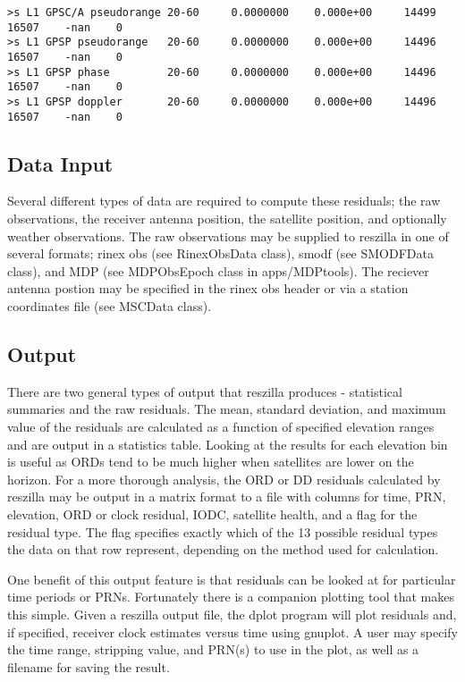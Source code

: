 \begin{\outputsize}
\begin{verbatim}
>s L1 GPSC/A pseudorange 20-60     0.0000000    0.000e+00     14499     16507    -nan    0
>s L1 GPSP pseudorange   20-60     0.0000000    0.000e+00     14496     16507    -nan    0
>s L1 GPSP phase         20-60     0.0000000    0.000e+00     14496     16507    -nan    0
>s L1 GPSP doppler       20-60     0.0000000    0.000e+00     14496     16507    -nan    0

\end{verbatim}

\end{\outputsize}

\subsection{Data Input}

Several different types of data are required to compute these
residuals; the raw observations, the receiver antenna position, the
satellite position, and optionally  weather observations. The raw
observations may be supplied to reszilla in one of several formats;
rinex obs (see RinexObsData class), smodf (see SMODFData class), and
MDP (see MDPObsEpoch class in apps/MDPtools). The reciever antenna
postion may be specified in the rinex obs header or via a station
coordinates file (see MSCData class).

\subsection{Output}
There are two general types of output that reszilla produces -
statistical summaries and the raw residuals.  The mean, standard 
deviation, and maximum value of the residuals are calculated 
as a function of specified elevation ranges and are output in a 
statistics table. Looking at the results for each elevation bin 
is useful as ORDs tend to be much higher when satellites are 
lower on the horizon. For a more thorough analysis, the ORD or DD 
residuals calculated by reszilla may be output in a matrix format 
to a file with columns for time, PRN, elevation, ORD or clock residual, 
IODC, satellite health, and a flag for the residual type.  The flag 
specifies exactly which of the 13 possible residual types the data 
on that row represent, depending on the method used for calculation. 

One benefit of this output feature is that residuals can be looked at 
for particular time periods or PRNs. Fortunately there is a companion 
plotting tool that makes this simple. Given a reszilla output file, 
the dplot program will plot residuals and, if specified, receiver clock 
estimates versus time using gnuplot. A user may specify the time 
range, stripping value, and PRN(s) to use in the plot, as well as a
filename for saving the result. 

